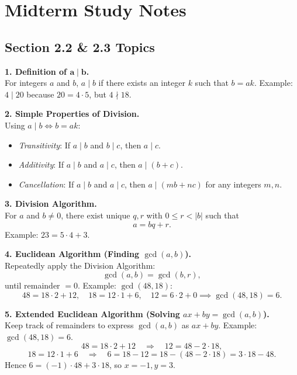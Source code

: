 \documentclass[10pt]{article}
\begin{document}
\fontsize{8}{10}\selectfont

\section*{Midterm Study Notes}

\subsection*{Section 2.2 \& 2.3 Topics}

\textbf{1. Definition of \(\mathbf{a \mid b}\).}\\
For integers \( a \) and \( b \), \( a \mid b\) if there exists an integer \( k \) such that \( b = ak \). Example: \(4 \mid 20\) because \(20 = 4 \cdot 5\), but \(4 \nmid 18\).

\textbf{2. Simple Properties of Division.}\\
Using \( a \mid b \iff b = a k\):
\begin{itemize}
\item \emph{Transitivity}: If \(a \mid b\) and \(b \mid c\), then \(a \mid c\).
\item \emph{Additivity}: If \(a \mid b\) and \(a \mid c\), then \(a \mid (b + c)\).
\item \emph{Cancellation}: If \(a \mid b\) and \(a \mid c\), then \(a \mid (mb + nc)\) for any integers \(m,n\).
\end{itemize}

\textbf{3. Division Algorithm.}\\
For \(a\) and \(b \neq 0\), there exist unique \(q,r\) with \(0 \le r < |b|\) such that
\[
a = bq + r.
\]
Example: \(23 = 5 \cdot 4 + 3\).

\textbf{4. Euclidean Algorithm (Finding \(\gcd(a,b)\)).}\\
Repeatedly apply the Division Algorithm:
\[
\gcd(a,b) = \gcd(b,r),
\]
until remainder \(=0\). Example: \(\gcd(48,18)\): 
\[
48 = 18 \cdot 2 + 12,\quad 18 = 12 \cdot 1 + 6,\quad 12 = 6 \cdot 2 + 0 \implies \gcd(48,18)=6.
\]

\textbf{5. Extended Euclidean Algorithm (Solving \(ax + by = \gcd(a,b)\)).}\\
Keep track of remainders to express \(\gcd(a,b)\) as \(ax + by\). Example: \(\gcd(48,18)=6\).
\[
48 = 18\cdot 2 + 12 \quad \Rightarrow \quad 12 = 48 - 2 \cdot 18,
\]
\[
18 = 12\cdot 1 + 6 \quad \Rightarrow \quad 6 = 18 - 12 = 18 - (48 - 2 \cdot 18) = 3 \cdot 18 - 48.
\]
Hence \(6=(-1)\cdot48 + 3\cdot18\), so \(x=-1,y=3\).
\end{document}
